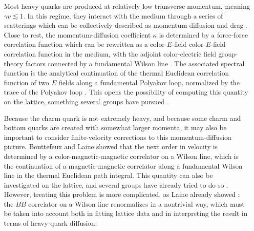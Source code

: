 \documentclass[floatfix,twocolumn,prd,showpacs,preprintnumbers,amsmath,nofootinbib,amssymb,superscriptaddress]{revtex4-2}
\begin{document}
Most heavy quarks are produced at relatively low transverse momentum, meaning $\gamma v \lesssim 1$.
In this regime, they interact with the medium through a series of scatterings which can be collectively described as momentum diffusion and drag
\cite{Moore:2004tg,vanHees:2004gq,Mustafa:2004dr}.
Close to rest, the momentum-diffusion coefficient $\kappa$ is determined by a force-force correlation function which can be rewritten as a color-$E$-field color-$E$-field correlation function in the medium, with the adjoint color-electric field group-theory factors connected by a fundamental Wilson line
\cite{CasalderreySolana:2006rq}.
The associated spectral function is the analytical continuation of the thermal Euclidean correlation function of two $E$ fields along a fundamental Polyakov loop, normalized by the trace of the Polyakov loop
\cite{Caron-Huot:2009ncn}.
This opens the possibility of computing this quantity on the lattice, something several groups have pursued
\cite{Francis:2015daa, Altenkort:2020fgs, Brambilla:2020siz,  Banerjee:2022gen, Altenkort:2023oms}.

Because the charm quark is not extremely heavy, and because some charm and bottom quarks are created with somewhat larger momenta, it may also be important to consider finite-velocity corrections to this momentum-diffusion picture.
Bouttefeux and Laine showed
\cite{Bouttefeux:2020ycy}
that the next order in velocity is determined by a color-magnetic-magnetic correlator on a Wilson line, which is the continuation of a magnetic-magnetic correlator along a fundamental Wilson line in the thermal Euclidean path integral.
This quantity can also be investigated on the lattice, and several groups have already tried to do so
\cite{Banerjee:2022uge, Brambilla:2022xbd,Altenkort:2023eav}.
However, treating this problem is more complicated, as Laine already showed
\cite{Laine:2021uzs}:
the $BB$ correlator on a Wilson line renormalizes in a nontrivial way, which must be taken into account both in fitting lattice data and in interpreting the result in terms of heavy-quark diffusion.
\end{document}
